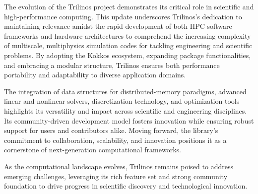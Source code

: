 
The evolution of the Trilinos project demonstrates its critical role in scientific and high-performance computing.
This update underscores Trilinos’s dedication to maintaining relevance amidst the rapid development of both HPC software frameworks and hardware architectures
to comprehend the increasing complexity of multiscale, multiphysics simulation codes for tackling engineering and scientific problems.
By adopting the Kokkos ecosystem, expanding package functionalities, and embracing a modular structure,
Trilinos ensures both performance portability and adaptability to diverse application domains.

The integration of data structures for distributed-memory paradigms, advanced linear and nonlinear solvers, discretization technology, and optimization tools highlights its versatility and impact across scientific and engineering disciplines.
Its community-driven development model fosters innovation while ensuring robust support for users and contributors alike.
Moving forward, the library’s commitment to collaboration, scalability, and innovation positions it as a cornerstone of next-generation computational frameworks.

As the computational landscape evolves, Trilinos remains poised to address emerging challenges, leveraging its rich feature set and strong community foundation to drive progress in scientific discovery and technological innovation.
